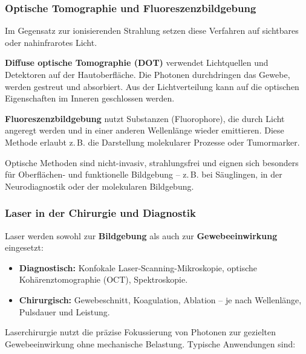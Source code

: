 \subsubsection{Optische Tomographie und Fluoreszenzbildgebung}

Im Gegensatz zur ionisierenden Strahlung setzen diese Verfahren auf sichtbares oder nahinfrarotes Licht.

\textbf{Diffuse optische Tomographie (DOT)} verwendet Lichtquellen und Detektoren auf der Hautoberfläche. Die Photonen durchdringen das Gewebe, werden gestreut und absorbiert. Aus der Lichtverteilung kann auf die optischen Eigenschaften im Inneren geschlossen werden.

\textbf{Fluoreszenzbildgebung} nutzt Substanzen (Fluorophore), die durch Licht angeregt werden und in einer anderen Wellenlänge wieder emittieren. Diese Methode erlaubt z.\,B. die Darstellung molekularer Prozesse oder Tumormarker.
\medskip
\begin{tcolorbox}[didaktikbox, title=Vorteil optischer Verfahren]
	\label{box:optisches Verfahren}
	\small
	Optische Methoden sind nicht-invasiv, strahlungsfrei und eignen sich besonders für Oberflächen- und funktionelle Bildgebung – z.\,B. bei Säuglingen, in der Neurodiagnostik oder der molekularen Bildgebung.
\end{tcolorbox}

\subsubsection{Laser in der Chirurgie und Diagnostik}

Laser werden sowohl zur \textbf{Bildgebung} als auch zur \textbf{Gewebeeinwirkung} eingesetzt:

\begin{itemize}
	\item \textbf{Diagnostisch:} Konfokale Laser-Scanning-Mikroskopie, optische Kohärenztomographie (OCT), Spektroskopie.
	\item \textbf{Chirurgisch:} Gewebeschnitt, Koagulation, Ablation – je nach Wellenlänge, Pulsdauer und Leistung.
\end{itemize}

Laserchirurgie nutzt die präzise Fokussierung von Photonen zur gezielten Gewebeeinwirkung ohne mechanische Belastung. Typische Anwendungen sind:

